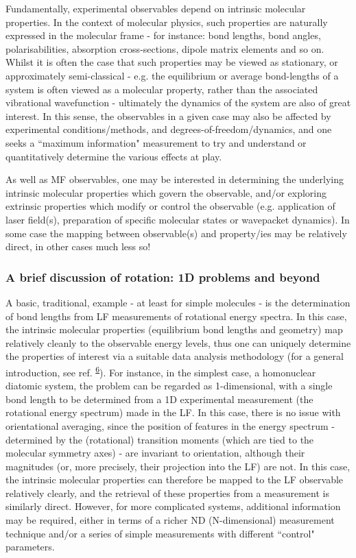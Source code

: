 \documentclass[10pt]{article}
\begin{document}
Fundamentally, experimental observables depend on intrinsic molecular properties. In the  context of molecular physics, such properties are naturally expressed in the molecular frame - for instance: bond lengths, bond angles, polarisabilities, absorption cross-sections, dipole matrix elements and so on. Whilst it is often the case that such properties may be viewed as stationary, or approximately semi-classical - e.g. the equilibrium or average bond-lengths of a system is often viewed as a molecular property, rather than the associated vibrational wavefunction - ultimately the dynamics of the system are also of great interest. In this sense, the observables in a given case may also be affected by experimental conditions/methods, and degrees-of-freedom/dynamics, and one seeks a ``maximum information" measurement to try and understand or quantitatively determine the various effects at play.

As well as MF observables, one may be interested in determining the underlying intrinsic molecular properties which govern the observable, and/or exploring extrinsic properties which modify or control the observable (e.g. application of laser field(s), preparation of specific molecular states or wavepacket dynamics). In some case the mapping between observable(s) and property/ies may be relatively direct, in other cases much less so!

\subsubsection{A brief discussion of rotation: 1D problems and beyond}

A basic, traditional, example - at least for simple molecules - is the determination of bond lengths from LF measurements of rotational energy spectra. In this case, the intrinsic molecular properties (equilibrium bond lengths and geometry) map relatively cleanly to the observable energy levels, thus one can uniquely determine the properties of interest via a suitable data analysis methodology (for a general introduction, see ref. \textsuperscript{\hyperref[csl:6]{6}}). For instance, in the simplest case, a homonuclear diatomic system, the problem can be regarded as 1-dimensional, with a single bond length to be determined from a 1D experimental measurement (the rotational energy spectrum) made in the LF. In this case, there is no issue with orientational averaging, since the position of features in the energy spectrum - determined by the (rotational) transition moments (which are tied to the molecular symmetry axes) - are invariant to orientation, although their magnitudes (or, more precisely, their projection into the LF) are not. In this case, the intrinsic molecular properties can therefore be mapped to the LF observable relatively clearly, and the retrieval of these properties from a measurement is similarly direct. However, for more complicated systems, additional information may be required, either in terms of a richer ND (N-dimensional) measurement technique and/or a series of simple measurements with different ``control" parameters.
\end{document}
